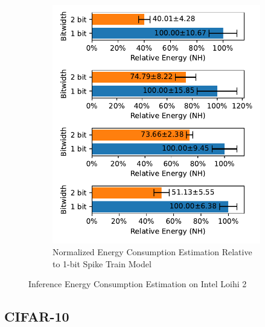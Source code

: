 \begin{figure}[H]
\begin{subfigure}[H]{0.48\textwidth}
                \includegraphics[width=\textwidth]{../timesteps/FashionMNIST/plots/fashionmnist_test_relative_energy_nh.pdf}
                \caption{Normalized Energy Consumption Estimation Relative to 1-bit Spike Train Model}
            \end{subfigure}
            \caption{Inference Energy Consumption Estimation on Intel Loihi 2}
        \end{figure}

    \subsection{CIFAR-10}
    \label{appendix:energy_tradeoff_cifar10}

